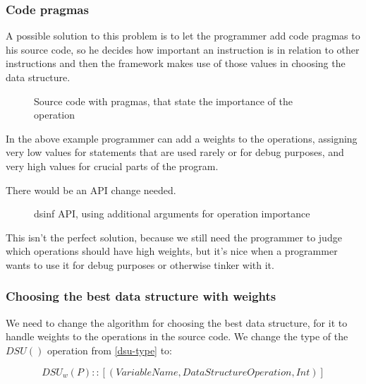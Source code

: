 \documentclass[a4paper,11pt]{article}
\begin{document}
		\subsubsection{Code pragmas} \label{sec:pragmas}

			A possible solution to this problem is to let the programmer add code pragmas to his source
			code, so he decides how important an instruction is in relation to other instructions and then
			the framework makes use of those values in choosing the data structure.

			\begin{figure}
				

				\caption{Source code with pragmas, that state the importance of the operation}

				\label{fig:code-pragmas}
			\end{figure}

			In the above example programmer can add a weights to the operations, assigning very low values
			for statements that are used rarely or for debug purposes, and very high values for crucial
			parts of the program.

			There would be an API change needed.

			\begin{figure}
				

				\caption{dsinf API, using additional arguments for operation importance}

				\label{fig:code-pragmas-api}
			\end{figure}

			This isn't the perfect solution, because we still need the programmer to judge which operations
			should have high weights, but it's nice when a programmer wants to use it for debug purposes or
			otherwise tinker with it.

		\subsubsection{Choosing the best data structure with weights} \label{sec:choose-weights}

			We need to change the algorithm for choosing the best data structure, for it to handle weights
			to the operations in the source code. We change the type of the $DSU()$ operation from
			\autoref{dsu-type} to:

			\begin{equation}
				DSU_w(P) :: [(VariableName, DataStructureOperation, Int)]
			\end{equation}
\end{document}
